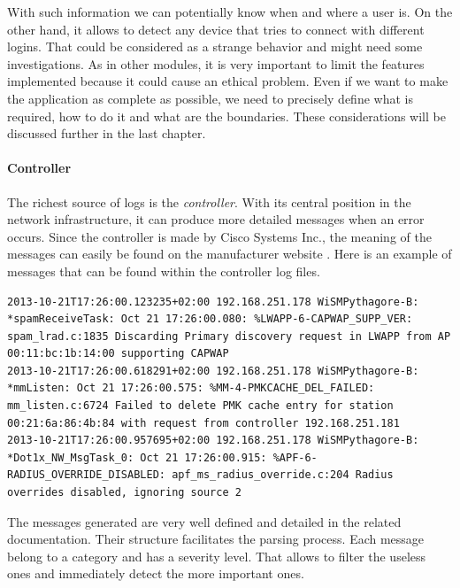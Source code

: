 With such information we can potentially know when and where a user is. On the other hand, it allows to detect any device that tries to connect with different logins. That could be considered as a strange behavior and might need some investigations. As in other modules, it is very important to limit the features implemented because it could cause an ethical problem. Even if we want to make the application as complete as possible, we need to precisely define what is required, how to do it and what are the boundaries. These considerations will be discussed further in the last chapter.


\paragraph{Controller}

The richest source of logs is the \emph{controller}. With its central position in the network infrastructure, it can produce more detailed messages when an error occurs. Since the controller is made by Cisco Systems Inc., the meaning of the messages can easily be found on the manufacturer website \cite{syslogCisco}. Here is an example of messages that can be found within the controller log files.\\

\begin{lstlisting}[frame=single,breaklines=true,caption={Controller logs}]
2013-10-21T17:26:00.123235+02:00 192.168.251.178 WiSMPythagore-B: *spamReceiveTask: Oct 21 17:26:00.080: %LWAPP-6-CAPWAP_SUPP_VER: spam_lrad.c:1835 Discarding Primary discovery request in LWAPP from AP 00:11:bc:1b:14:00 supporting CAPWAP
2013-10-21T17:26:00.618291+02:00 192.168.251.178 WiSMPythagore-B: *mmListen: Oct 21 17:26:00.575: %MM-4-PMKCACHE_DEL_FAILED: mm_listen.c:6724 Failed to delete PMK cache entry for station 00:21:6a:86:4b:84 with request from controller 192.168.251.181
2013-10-21T17:26:00.957695+02:00 192.168.251.178 WiSMPythagore-B: *Dot1x_NW_MsgTask_0: Oct 21 17:26:00.915: %APF-6-RADIUS_OVERRIDE_DISABLED: apf_ms_radius_override.c:204 Radius overrides disabled, ignoring source 2 
\end{lstlisting}

The messages generated are very well defined and detailed in the related documentation. Their structure facilitates the parsing process. Each message belong to a category and has a severity level. That allows to filter the useless ones and immediately detect the more important ones.

